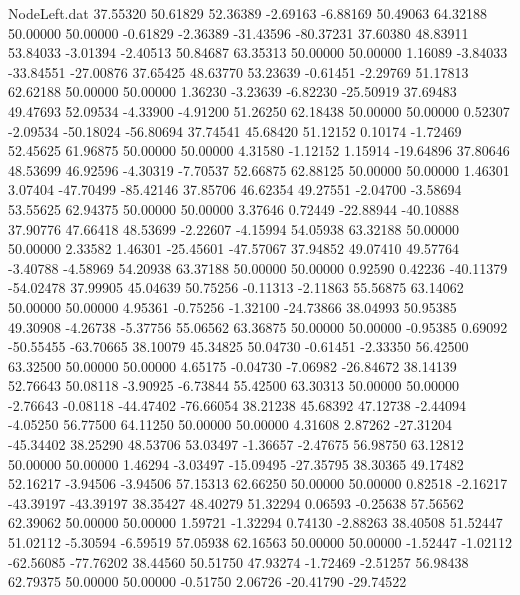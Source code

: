 \begin{filecontents}{NodeLeft.dat}
  37.55320   50.61829   52.36389    -2.69163   -6.88169   50.49063   64.32188   50.00000   50.00000   -0.61829   -2.36389  -31.43596  -80.37231
  37.60380   48.83911   53.84033    -3.01394   -2.40513   50.84687   63.35313   50.00000   50.00000    1.16089   -3.84033  -33.84551  -27.00876
  37.65425   48.63770   53.23639    -0.61451   -2.29769   51.17813   62.62188   50.00000   50.00000    1.36230   -3.23639   -6.82230  -25.50919
  37.69483   49.47693   52.09534    -4.33900   -4.91200   51.26250   62.18438   50.00000   50.00000    0.52307   -2.09534  -50.18024  -56.80694
  37.74541   45.68420   51.12152     0.10174   -1.72469   52.45625   61.96875   50.00000   50.00000    4.31580   -1.12152    1.15914  -19.64896
  37.80646   48.53699   46.92596    -4.30319   -7.70537   52.66875   62.88125   50.00000   50.00000    1.46301    3.07404  -47.70499  -85.42146
  37.85706   46.62354   49.27551    -2.04700   -3.58694   53.55625   62.94375   50.00000   50.00000    3.37646    0.72449  -22.88944  -40.10888
  37.90776   47.66418   48.53699    -2.22607   -4.15994   54.05938   63.32188   50.00000   50.00000    2.33582    1.46301  -25.45601  -47.57067
  37.94852   49.07410   49.57764    -3.40788   -4.58969   54.20938   63.37188   50.00000   50.00000    0.92590    0.42236  -40.11379  -54.02478
  37.99905   45.04639   50.75256    -0.11313   -2.11863   55.56875   63.14062   50.00000   50.00000    4.95361   -0.75256   -1.32100  -24.73866
  38.04993   50.95385   49.30908    -4.26738   -5.37756   55.06562   63.36875   50.00000   50.00000   -0.95385    0.69092  -50.55455  -63.70665
  38.10079   45.34825   50.04730    -0.61451   -2.33350   56.42500   63.32500   50.00000   50.00000    4.65175   -0.04730   -7.06982  -26.84672
  38.14139   52.76643   50.08118    -3.90925   -6.73844   55.42500   63.30313   50.00000   50.00000   -2.76643   -0.08118  -44.47402  -76.66054
  38.21238   45.68392   47.12738    -2.44094   -4.05250   56.77500   64.11250   50.00000   50.00000    4.31608    2.87262  -27.31204  -45.34402
  38.25290   48.53706   53.03497    -1.36657   -2.47675   56.98750   63.12812   50.00000   50.00000    1.46294   -3.03497  -15.09495  -27.35795
  38.30365   49.17482   52.16217    -3.94506   -3.94506   57.15313   62.66250   50.00000   50.00000    0.82518   -2.16217  -43.39197  -43.39197
  38.35427   48.40279   51.32294     0.06593   -0.25638   57.56562   62.39062   50.00000   50.00000    1.59721   -1.32294    0.74130   -2.88263
  38.40508   51.52447   51.02112    -5.30594   -6.59519   57.05938   62.16563   50.00000   50.00000   -1.52447   -1.02112  -62.56085  -77.76202
  38.44560   50.51750   47.93274    -1.72469   -2.51257   56.98438   62.79375   50.00000   50.00000   -0.51750    2.06726  -20.41790  -29.74522

\end{filecontents}
